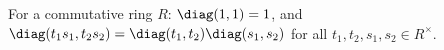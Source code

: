 For a commutative ring $R$: $\diag(1,1)=1$, and $\diag(t_1s_1,t_2s_2)=\diag(t_1,t_2)\diag(s_1,s_2)$ for all $t_1,t_2,s_1,s_2\in R^\times$.
